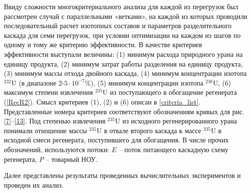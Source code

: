 Ввиду сложности многокритериального анализа для каждой из перегрузок был рассмотрен случай с параллельными «ветками», на каждой из которых проводили последовательный расчет изотопных составов и параметров разделительного каскада для семи перегрузок, при условии оптимизации на каждом из шагов по одному и тому же критерию эффективности. В качестве критериев эффективности выступали величины: (1) минимум расхода природного урана на единицу продукта, (2) минимум затрат работы разделения на единицу продукта, (3) минимум массы отхода двойного каскада, (4) минимум концентрации изотопа $^{232}$U (в диапазоне 2-$5\cdot10^{-7}$\%), (5) минимум концентрации изотопа $^{236}$U, (6) максимум степени извлечения $^{235}$U из поступающего в обогащение регенерата (\ref{RecR2}). Смысл критериев (1), (2) и (6) описан в \ref{criteria_list}. Представленные номера критериев соответствуют обозначениям кривых для рис. \ref{7}–\ref{13}. Под степенью извлечения $^{235}$U из исходного регенерированного урана понимали отношение массы $^{235}$U в отвале второго каскада к массе $^{235}$U в исходной смеси регенерата, поступившего для обогащения. В числе прочих обозначений, используются потоки: $E$ – поток питающего каскадную схему регенерата, $P$ -- товарный НОУ.


Далее представлены результаты проведенных вычислительных экспериментов и проведен их анализ.

